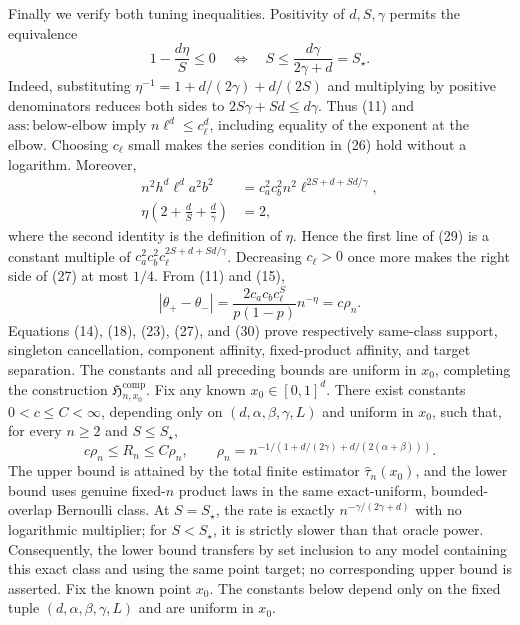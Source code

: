 Finally we verify both tuning inequalities.  Positivity of \(d,S,\gamma\) permits the equivalence
\[
 1-\frac{d\eta}{S}\le0
 \quad\Longleftrightarrow\quad
 S\le\frac{d\gamma}{2\gamma+d}=S_\star.                       \tag{28}
\]
Indeed, substituting \(\eta^{-1}=1+d/(2\gamma)+d/(2S)\) and multiplying by positive denominators reduces both sides to \(2S\gamma+Sd\le d\gamma\).  Thus (11) and \(\mathrm{ass:below\mbox{-}elbow}\) imply \(n\ell^d\le c_\ell^d\), including equality of the exponent at the elbow.  Choosing \(c_\ell\) small makes the series condition in (26) hold without a logarithm.  Moreover,
\[
\begin{aligned}
 n^2h^d\ell^da^2b^2
 &=c_a^2c_b^2n^2\ell^{2S+d+Sd/\gamma},\\
 \eta\left(2+\frac dS+\frac d\gamma\right)&=2,
                                                                    \tag{29}
\end{aligned}
\]
where the second identity is the definition of \(\eta\).  Hence the first line of (29) is a constant multiple of \(c_a^2c_b^2c_\ell^{2S+d+Sd/\gamma}\).  Decreasing \(c_\ell>0\) once more makes the right side of (27) at most \(1/4\).  From (11) and (15),
\[
 |\theta_+-\theta_-|
 =\frac{2c_ac_bc_\ell^S}{p(1-p)}n^{-\eta}
 =c\rho_n.                                                       \tag{30}
\]
Equations (14), (18), (23), (27), and (30) prove respectively same-class support, singleton cancellation, component affinity, fixed-product affinity, and target separation.  The constants and all preceding bounds are uniform in \(x_0\), completing the construction \(\mathfrak H_{n,x_0}^{\mathrm{comp}}\).
Fix any known \(x_0\in[0,1]^d\).  There exist constants \(0<c\le C<\infty\), depending only on \((d,\alpha,\beta,\gamma,L)\) and uniform in \(x_0\), such that, for every \(n\ge2\) and \(S\le S_\star\),
\[
c\rho_n\le R_n\le C\rho_n,\qquad
\rho_n=n^{-1/(1+d/(2\gamma)+d/(2(\alpha+\beta)))}.
\]
The upper bound is attained by the total finite estimator \(\widehat\tau_n(x_0)\), and the lower bound uses genuine fixed-\(n\) product laws in the same exact-uniform, bounded-overlap Bernoulli class.  At \(S=S_\star\), the rate is exactly \(n^{-\gamma/(2\gamma+d)}\) with no logarithmic multiplier; for \(S<S_\star\), it is strictly slower than that oracle power.  Consequently, the lower bound transfers by set inclusion to any model containing this exact class and using the same point target; no corresponding upper bound is asserted.
Fix the known point \(x_0\).  The constants below depend only on the fixed tuple \((d,\alpha,\beta,\gamma,L)\) and are uniform in \(x_0\).

